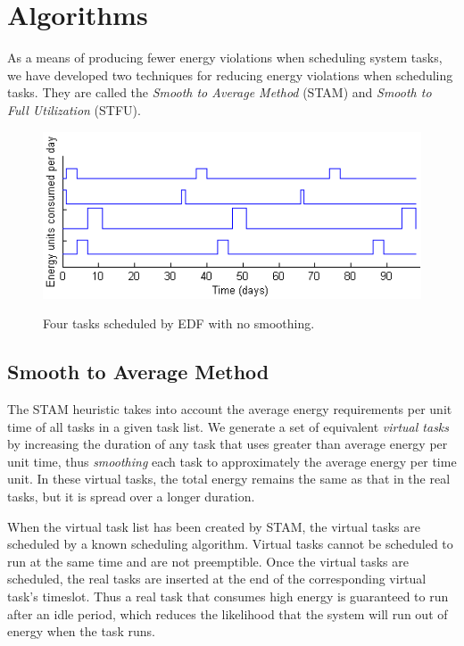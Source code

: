 
\section{Algorithms} \label{sec:algorithms}

As a means of producing fewer energy violations when scheduling system tasks, we have developed two techniques for reducing energy violations when scheduling tasks.  They are called the \emph{Smooth to Average Method} (\textsc{STAM}) and \emph{Smooth to Full Utilization} (\textsc{STFU}). 
\begin{figure}[htb]
\includegraphics[scale=0.72]{edftasks.png}
\label{fig:edftasksched}
\caption{Four tasks scheduled by EDF with no smoothing.}
\end{figure}
\subsection{Smooth to Average Method}
The STAM heuristic takes into account the average energy requirements per unit time of all tasks in a given task list. We generate a set of equivalent \emph{virtual tasks} by increasing the duration of any task that uses greater than average energy per unit time, thus \emph{smoothing} each task to approximately the average energy per time unit. In these virtual tasks, the total energy remains the same as that in the real tasks, but it is spread over a longer duration.  

When the virtual task list has been created by STAM, the virtual tasks are scheduled by a known scheduling algorithm.  Virtual tasks cannot be scheduled to run at the same time and are not preemptible.  Once the virtual tasks are scheduled, the real tasks are inserted at the end of the corresponding virtual task's timeslot.  Thus a real task that consumes high energy is guaranteed to run after an idle period, which reduces the likelihood that the system will run out of energy when the task runs.

